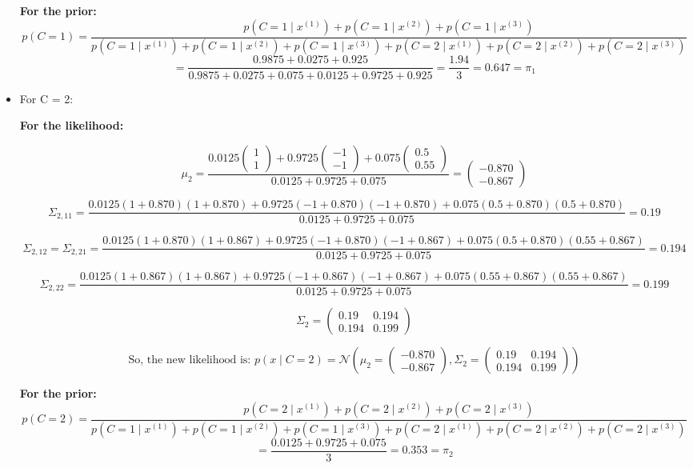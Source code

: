 \documentclass{article}
\begin{document}
\begin{itemize}
\textbf{For the prior:}
{\scriptsize
\[
p(C = 1) = \frac{p(C=1 \mid x^{(1)}) + p(C=1 \mid x^{(2)}) + p(C=1 \mid x^{(3)})}{p(C=1 \mid x^{(1)}) + p(C=1 \mid x^{(2)}) + p(C=1 \mid x^{(3)}) + p(C=2 \mid x^{(1)}) + p(C=2 \mid x^{(2)}) + p(C=2 \mid x^{(3)})}
\]
}
\[
= \frac{0.9875 + 0.0275 + 0.925}{0.9875 + 0.0275 + 0.075 + 0.0125 + 0.9725 + 0.925} = \frac{1.94}{3} = 0.647 = \pi_1
\]

\newpage

\item[\textbullet] For C = 2: 

\textbf{For the likelihood:}

\[
\mu_2 = \frac{0.0125 \begin{pmatrix} 1 \\ 1 \end{pmatrix} + 0.9725 \begin{pmatrix} -1 \\ -1 \end{pmatrix} + 0.075 \begin{pmatrix} 0.5 \\ 0.55 \end{pmatrix}}{0.0125 + 0.9725 + 0.075} = \begin{pmatrix} -0.870 \\ -0.867 \end{pmatrix}
\]
{\scriptsize
\[
\Sigma_{2,11} = \frac{0.0125(1 + 0.870)(1 + 0.870) + 0.9725(-1 + 0.870)(-1 + 0.870) + 0.075(0.5 + 0.870)(0.5 + 0.870)}{0.0125 + 0.9725 + 0.075} = 0.19
\]

\[
\Sigma_{2,12} = \Sigma_{2,21} = \frac{0.0125(1 + 0.870)(1 + 0.867) + 0.9725(-1 + 0.870)(-1 + 0.867) + 0.075(0.5 + 0.870)(0.55 + 0.867)}{0.0125 + 0.9725 + 0.075} = 0.194
\]

\[
\Sigma_{2,22} = \frac{0.0125(1 + 0.867)(1 + 0.867) + 0.9725(-1 + 0.867)(-1 + 0.867) + 0.075(0.55 + 0.867)(0.55 + 0.867)}{0.0125 + 0.9725 + 0.075} = 0.199
\]
}
\[
\Sigma_2 = \begin{pmatrix} 0.19 & 0.194 \\ 0.194 & 0.199 \end{pmatrix}
\]

\[
\text{So, the new likelihood is: } p(x \mid C = 2) = \mathcal{N}\left(\mu_2 = \begin{pmatrix} -0.870 \\ -0.867 \end{pmatrix}, \Sigma_2 = \begin{pmatrix} 0.19 & 0.194 \\ 0.194 & 0.199 \end{pmatrix} \right)
\]

\textbf{For the prior:}
{\scriptsize
\[
p(C = 2) = \frac{p(C=2 \mid x^{(1)}) + p(C=2 \mid x^{(2)}) + p(C=2 \mid x^{(3)})}{p(C=1 \mid x^{(1)}) + p(C=1 \mid x^{(2)}) + p(C=1 \mid x^{(3)}) + p(C=2 \mid x^{(1)}) + p(C=2 \mid x^{(2)}) + p(C=2 \mid x^{(3)})}
\]
}
\[
= \frac{0.0125 + 0.9725 + 0.075}{3} = 0.353 = \pi_2
\]

\end{itemize}
\end{document}
